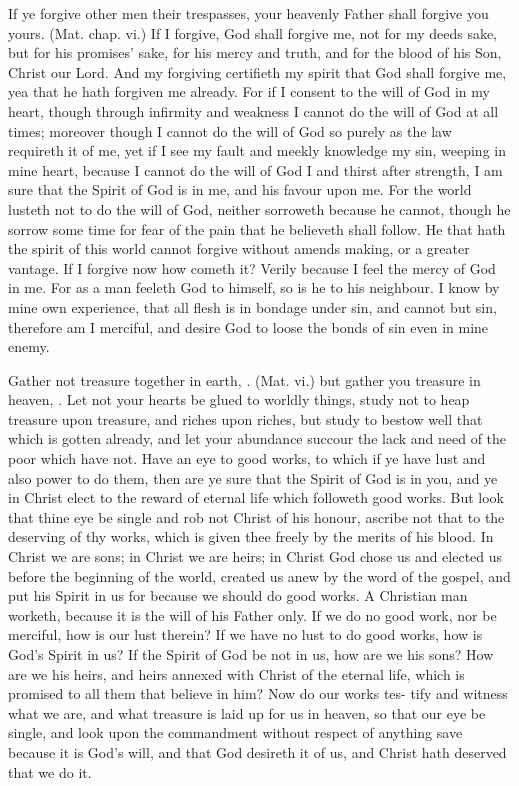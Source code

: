 \documentclass{article}
\begin{document}
If ye forgive other men their trespasses, your heavenly 
Father shall forgive you yours. (Mat. chap. vi.) If I 
forgive, God shall forgive me, not for my deeds sake, but 
for his promises' sake, for his mercy and truth, and for the 
blood of his Son, Christ our Lord. And my forgiving
certifieth my spirit that God shall forgive me, yea that he
hath forgiven me already. For if I consent to the will of
God in my heart, though through infirmity and weakness 
I cannot do the will of God at all times; moreover though 
I cannot do the will of God so purely as the law requireth 
it of me, yet if I see my fault and meekly knowledge my 
sin, weeping in mine heart, because I cannot do the will of 
God I and thirst after strength, I am sure that the Spirit of 
God is in me, and his favour upon me. For the world 
lusteth not to do the will of God, neither sorroweth because 
he cannot, though he sorrow some time for fear of the pain 
that he believeth shall follow. He that hath the spirit of 
this world cannot forgive without amends making, or a 
greater vantage. If I forgive now how cometh it? Verily 
because I feel the mercy of God in me. For as a man 
feeleth God to himself, so is he to his neighbour. I know 
by mine own experience, that all flesh is in bondage under 
sin, and cannot but sin, therefore am I merciful, and desire 
God to loose the bonds of sin even in mine enemy. 


Gather not treasure together in earth, \ampc. (Mat. vi.)
but gather you treasure in heaven, \ampc. Let not your 
hearts be glued to worldly things, study not to heap treasure 
upon treasure, and riches upon riches, but study to bestow 
well that which is gotten already, and let your abundance 
succour the lack and need of the poor which have not. 
Have an eye to good works, to which if ye have lust 
and also power to do them, then are ye sure that the Spirit 
of God is in you, and ye in Christ elect to the reward of 
eternal life which followeth good works. But look that 
thine eye be single and rob not Christ of his honour, 
ascribe not that to the deserving of thy works, which is 
given thee freely by the merits of his blood. In Christ we 
are sons; in Christ we are heirs; in Christ God chose us 
and elected us before the beginning of the world, created 
us anew by the word of the gospel, and put his Spirit in 
us for because we should do good works. A Christian 
man worketh, because it is the will of his Father only. 
If we do no good work, nor be merciful, how is our lust 
therein? If we have no lust to do good works, how is 
God's Spirit in us? If the Spirit of God be not in us, 
how are we his sons? How are we his heirs, and heirs 
annexed with Christ of the eternal life, which is promised 
to all them that believe in him? Now do our works tes- 
tify and witness what we are, and what treasure is laid up 
for us in heaven, so that our eye be single, and look upon 
the commandment without respect of anything save because 
it is God's will, and that God desireth it of us, and Christ 
hath deserved that we do it. 
\end{document}
